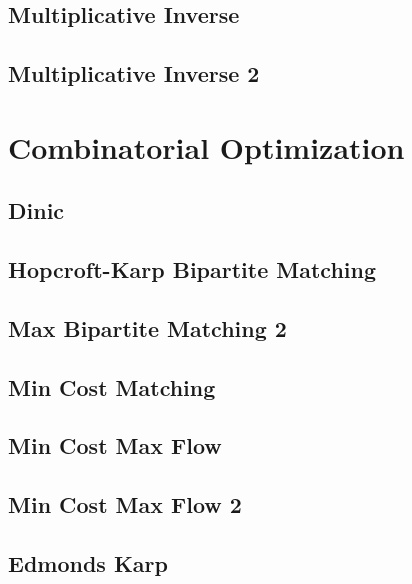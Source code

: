 \subsection{Multiplicative Inverse}
\raggedbottom
\hrulefill
\subsection{Multiplicative Inverse 2}
\raggedbottom
\hrulefill

\section{Combinatorial Optimization}
\subsection{Dinic}
\raggedbottom
\hrulefill
\subsection{Hopcroft-Karp Bipartite Matching}
\raggedbottom
\hrulefill
\subsection{Max Bipartite Matching 2}
\raggedbottom
\hrulefill
\subsection{Min Cost Matching}
\raggedbottom
\hrulefill
\subsection{Min Cost Max Flow}
\raggedbottom
\hrulefill
\subsection{Min Cost Max Flow 2}
\raggedbottom
\hrulefill
\subsection{Edmonds Karp}
\raggedbottom
\hrulefill

